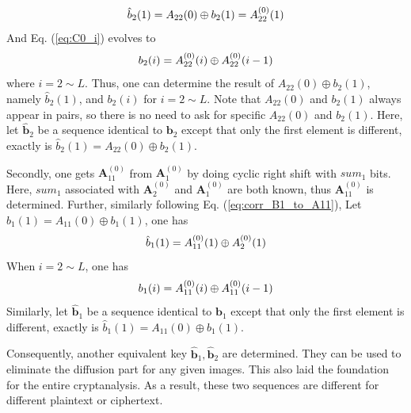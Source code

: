 \documentclass[final,3p,times]{elsarticle}
\begin{document}
\begin{equation*}
\hat{b}_{2}(1)=A_{22}(0) \oplus b_{2}(1)=A_{22}^{(0)}(1) \\
\end{equation*}
And Eq. (\ref{eq:C0_i}) evolves to
\begin{equation*}
b_{2}(i) = A_{22}^{(0)}(i) \oplus A_{22}^{(0)}(i-1) \\
\end{equation*}
where $i=2 \sim L$. Thus, one can determine the result of $A_{22}(0) \oplus b_{2}(1)$, namely $\hat{b}_{2}(1)$, and $b_{2}(i)$ for $i=2 \sim L$. Note that $A_{22}(0)$ and $b_{2}(1)$ always appear in pairs, so there is no need to ask for specific $A_{22}(0)$ and $b_{2}(1)$. Here, let $\bm{\hat{b}}_2$ be a sequence identical to $\bm{b}_2$ except that only the first element is different, exactly is $\hat{b}_{2}(1)=A_{22}(0) \oplus b_{2}(1)$.

Secondly, one gets $\bm{A}_{11}^{(0)}$ from $\bm{A}_{1}^{(0)}$ by doing cyclic right shift with $sum_1$ bits. Here, $sum_1$ associated with $\bm{A}_{2}^{(0)}$ and $\bm{A}_{1}^{(0)}$ are both known, thus $\bm{A}_{11}^{(0)}$ is determined. Further, similarly following Eq. (\ref{eq:corr_B1_to_A11}), 
Let $\hat{b}_{1}(1)=A_{11}(0) \oplus b_{1}(1)$, one has
\begin{equation*}
\hat{b}_{1}(1)=A_{11}^{(0)}(1) \oplus A_{2}^{(0)}(1) \\
\end{equation*}
When $i=2 \sim L$, one has
\begin{equation*}
b_{1}(i) = A_{11}^{(0)}(i) \oplus  A_{11}^{(0)}(i-1) \\
\end{equation*}
Similarly, let $\bm{\hat{b}}_1$ be a sequence identical to $\bm{b}_1$ except that only the first element is different, exactly is $\hat{b}_{1}(1)=A_{11}(0) \oplus b_{1}(1)$.

Consequently, another equivalent key $\bm{\hat{b}}_1,\bm{\hat{b}}_2$ are determined. They can be used to eliminate the diffusion part for any given images. This also laid the foundation for the entire cryptanalysis. As a result, these two sequences are different for different plaintext or ciphertext.
\end{document}
